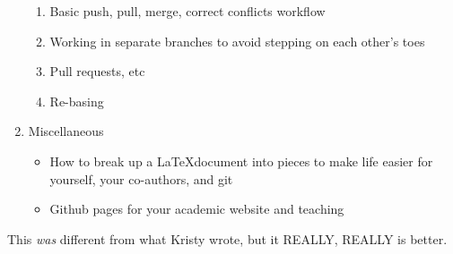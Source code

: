\documentclass[12pt,letterpaper]{article}
\begin{document}
\begin{enumerate}
\begin{enumerate}
			\item Basic push, pull, merge, correct conflicts workflow
			\item Working in separate branches to avoid stepping on each other's toes
			\item Pull requests, etc 
			\item Re-basing
		\end{enumerate}
	\item Miscellaneous
		\begin{itemize}
			\item How to break up a \LaTeX document into pieces to make life easier for yourself, your co-authors, and git
			\item Github pages for your academic website and teaching
		\end{itemize}
\end{enumerate}
This \textit{was} different from what Kristy wrote, but it REALLY, REALLY is better.
\end{document}
